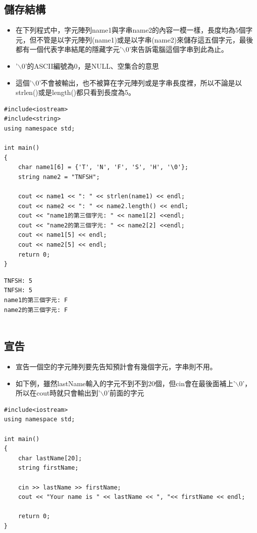 \documentclass[a4paper,12pt]{article}
\begin{document}
\subsection{儲存結構}
\label{sec:orgcb2e27a}
\begin{itemize}
\item 在下列程式中，字元陣列name1與字串name2的內容一模一樣，長度均為5個字元，但不管是以字元陣列(name1)或是以字串(name2)來儲存這五個字元，最後都有一個代表字串結尾的隱藏字元'$\backslash$0'來告訴電腦這個字串到此為止。\\
\item '$\backslash$0'的ASCII編號為0，是NULL、空集合的意思\\
\item 這個'$\backslash$0'不會被輸出，也不被算在字元陣列或是字串長度裡，所以不論是以strlen()或是length()都只看到長度為5。\\
\end{itemize}
\lstset{breaklines=true,language=cpp,label= ,caption= ,captionpos=b,firstnumber=1,numbers=left}
\begin{lstlisting}
#include<iostream>
#include<string>
using namespace std;

int main()
{
    char name1[6] = {'T', 'N', 'F', 'S', 'H', '\0'};
    string name2 = "TNFSH";

    cout << name1 << ": " << strlen(name1) << endl;
    cout << name2 << ": " << name2.length() << endl;
    cout << "name1的第三個字元: " << name1[2] <<endl;
    cout << "name2的第三個字元: " << name2[2] <<endl;
    cout << name1[5] << endl;
    cout << name2[5] << endl;
    return 0;
}
\end{lstlisting}

\begin{verbatim}
TNFSH: 5
TNFSH: 5
name1的第三個字元: F
name2的第三個字元: F
 
 
\end{verbatim}
\subsection{宣告}
\label{sec:org2edf7d7}
\begin{itemize}
\item 宣告一個空的字元陣列要先告知預計會有幾個字元，字串則不用。\\
\item 如下例，雖然lastName輸入的字元不到不到20個，但cin會在最後面補上'$\backslash$0'，所以在cout時就只會輸出到'$\backslash$0'前面的字元\\
\end{itemize}
\lstset{breaklines=true,language=cpp,label= ,caption= ,captionpos=b,firstnumber=1,numbers=left}
\begin{lstlisting}
#include<iostream>
using namespace std;

int main()
{
    char lastName[20];
    string firstName;

    cin >> lastName >> firstName;
    cout << "Your name is " << lastName << ", "<< firstName << endl;

    return 0;
}
\end{lstlisting}
\end{document}
